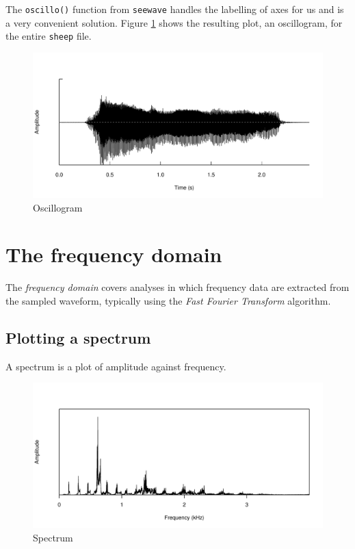 \documentclass[
]{book}
\begin{document}
The \texttt{oscillo()} function from \texttt{seewave} handles the labelling of axes for us and is a very convenient solution. Figure \ref{fig:amplitude-oscillo} shows the resulting plot, an oscillogram, for the entire \texttt{sheep} file.

\begin{figure}

{\centering \includegraphics[width=0.9\linewidth]{_main_files/figure-latex/amplitude-oscillo-1} 

}

\caption{Oscillogram}\label{fig:amplitude-oscillo}
\end{figure}

\hypertarget{the-frequency-domain}{%
\section{The frequency domain}\label{the-frequency-domain}}

The \emph{frequency domain} covers analyses in which frequency data are extracted from the sampled waveform, typically using the \emph{Fast Fourier Transform} algorithm.

\hypertarget{plotting-a-spectrum}{%
\subsection{Plotting a spectrum}\label{plotting-a-spectrum}}

A spectrum is a plot of amplitude against frequency.

\begin{figure}

{\centering \includegraphics[width=0.9\linewidth]{_main_files/figure-latex/spectrum-1} 

}

\caption{Spectrum}\label{fig:spectrum}
\end{figure}
\end{document}
